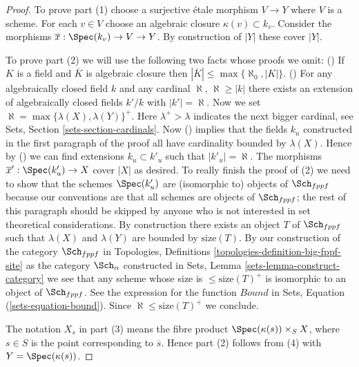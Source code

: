 \begin{proof}
To prove part (1) choose a surjective \'etale morphism $V \to Y$ where
$V$ is a scheme. For each $v \in V$ choose an algebraic closure
$\kappa(v) \subset k_v$. Consider the morphisms
$\overline{x} : \Spec(k_v) \to V \to Y$.
By construction of $|Y|$ these cover $|Y|$.

\medskip\noindent
To prove part (2) we will use the following two facts whose proofs we omit:
() If $K$ is a field and $\overline{K}$ is algebraic closure then
$|\overline{K}| \leq \max\{\aleph_0, |K|\}$.
() For any algebraically closed field $k$ and any cardinal
$\aleph$, $\aleph \geq |k|$ there exists an extension of algebraically
closed fields $k'/k$ with $|k'| = \aleph$.
Now we set $\aleph = \max\{\lambda(X), \lambda(Y)\}^+$.
Here $\lambda^+ > \lambda$ indicates the next bigger cardinal, see
Sets, Section \ref{sets-section-cardinals}.
Now ()
implies that the fields $k_u$ constructed in the first paragraph
of the proof all have cardinality bounded by $\lambda(X)$. Hence
by () we can find extensions $k_u \subset k'_u$ such that
$|k'_u| = \aleph$. The morphisms
$\overline{x}' : \Spec(k'_u) \to X$ cover $|X|$ as desired.
To really finish the proof of (2) we need to show that the schemes
$\Spec(k'_u)$ are (isomorphic to) objects of $\Sch_{fppf}$
because our conventions are that all schemes are objects of
$\Sch_{fppf}$; the rest of this paragraph should be skipped by
anyone who is not interested in set theoretical considerations. By
construction there exists an object $T$ of $\Sch_{fppf}$ such that
$\lambda(X)$ and $\lambda(Y)$ are bounded by $\text{size}(T)$.
By our construction of the category $\Sch_{fppf}$ in
Topologies, Definitions \ref{topologies-definition-big-fppf-site}
as the category $\Sch_\alpha$ constructed in
Sets, Lemma \ref{sets-lemma-construct-category}
we see that any scheme whose size is $\leq \text{size}(T)^+$
is isomorphic to an object of $\Sch_{fppf}$. See
the expression for the function $Bound$ in
Sets, Equation (\ref{sets-equation-bound}).
Since $\aleph \leq \text{size}(T)^+$ we conclude.

\medskip\noindent
The notation $X_s$ in part (3) means
the fibre product $\Spec(\kappa(s)) \times_S X$, where $s \in S$
is the point corresponding to $\overline{s}$. Hence part (2) follows
from (4) with $Y = \Spec(\kappa(s))$.


\end{proof}
